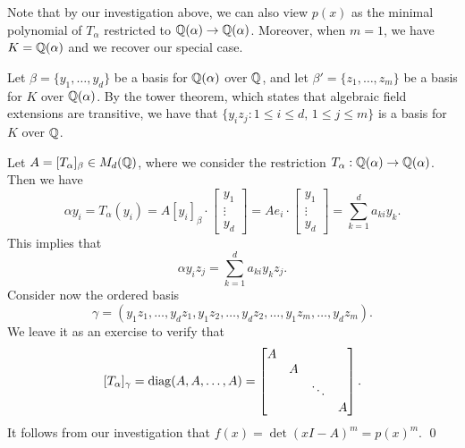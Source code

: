 Note that by our investigation above, we can also view $p(x)$ as the 
minimal polynomial of $T_\alpha$ restricted to $\mathbb{Q}(\alpha) \to \mathbb{Q}(\alpha)$. 
Moreover, when $m = 1$, we have $K = \mathbb{Q}(\alpha)$ and we 
recover our special case.

\begin{pf}
    Let $\beta = \{y_1, \dots, y_d\}$ be a basis for $\mathbb{Q}(\alpha)$ over $\mathbb{Q}$, 
    and let $\beta' = \{z_1, \dots, z_m\}$ be a basis for $K$ over $\mathbb{Q}(\alpha)$.
    By the tower theorem, which states that algebraic field extensions are 
    transitive, we have that $\{y_i z_j : 1 \leq i \leq d,\, 1 \leq j \leq m\}$ 
    is a basis for $K$ over $\mathbb{Q}$. 

    Let $A = [T_\alpha]_\beta \in M_d(\mathbb{Q})$, where we consider the 
    restriction $T_\alpha : \mathbb{Q}(\alpha) \to \mathbb{Q}(\alpha)$. Then we have 
    \[ \alpha y_i = T_\alpha(y_i) 
    = A[y_i]_\beta \cdot \begin{bmatrix} y_1 \\ \vdots \\ y_d \end{bmatrix} 
    = Ae_i \cdot \begin{bmatrix} y_1 \\ \vdots \\ y_d \end{bmatrix} 
    = \sum_{k=1}^d a_{ki} y_k. \]
    This implies that 
    \[ \alpha y_i z_j = \sum_{k=1}^d a_{ki} y_k z_j. \] 
    Consider now the ordered basis 
    \[ \gamma = (y_1z_1, \dots, y_dz_1, y_1z_2, \dots, y_dz_2, \dots, 
    y_1z_m, \dots, y_dz_m). \] 
    We leave it as an exercise to verify that 
    \[ [T_\alpha]_\gamma = \operatorname{diag}(A, A, \dots, A) = 
    \begin{bmatrix} A & & & \\ & A & & \\ & & \ddots & \\ & & & A \end{bmatrix}. \] 
    It follows from our investigation that $f(x) = \det(xI - A)^m = p(x)^m$. \qed
\end{pf}\vspace{-0.25cm}\newpage

